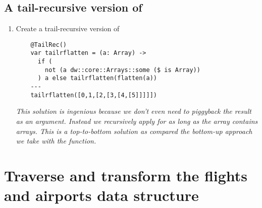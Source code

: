 \subsection{A tail-recursive version of }
\begin{enumerate}[resume*]
\item Create a trail-recursive version of 
  \begin{verbatim}
    @TailRec()
    var tailrflatten = (a: Array) -> 
      if ( 
        not (a dw::core::Arrays::some ($ is Array))
      ) a else tailrflatten(flatten(a))
    ---
    tailrflatten([0,1,[2,[3,[4,[5]]]]])
  \end{verbatim}
  \emph{
    This solution is ingenious because we don't even need to piggyback the result as an argument.  Instead we recursively apply  for as long as the array contains arrays.  This  is a top-to-bottom solution as compared the bottom-up approach we take with the  function.
  }
\end{enumerate}


\section{Traverse and transform the flights and airports data structure}

